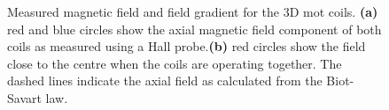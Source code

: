 \begin{figure}[!htbp]
	\centering
	\def\svgwidth{\columnwidth}
	\caption[Measured magnetic field and field gradient for the 3D \ac{mot}
		coils]{Measured magnetic field and field gradient for the 3D \ac{mot}
		coils. \textbf{(a)} red and blue circles show the axial magnetic
    field component of both coils as
		measured using a Hall probe.\textbf{(b)} red circles show the
    field close to the centre when the coils are operating together. The dashed lines indicate the axial field as
		calculated from the Biot-Savart law.}
    \label{fig:mot_coil_plots_subfig}	
\end{figure}

